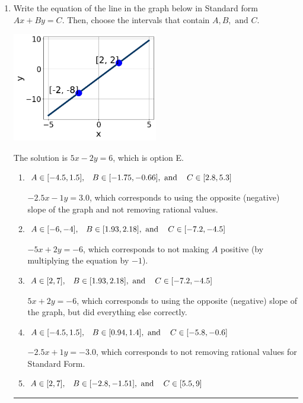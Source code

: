 \documentclass{extbook}[14pt]
\newcommand{\litem}[1]{\item #1

\rule{\textwidth}{0.4pt}}
\begin{document}
\begin{enumerate}\litem{
Write the equation of the line in the graph below in Standard form $Ax+By=C$. Then, choose the intervals that contain $A, B, \text{ and } C$.

\begin{center}
    \includegraphics[width=0.5\textwidth]{../Figures/linearGraphToStandardC.png}
\end{center}


The solution is \( 5x - 2y = 6 \), which is option E.\begin{enumerate}[label=\Alph*.]
\item \( A \in [-4.5, 1.5], \hspace{3mm} B \in [-1.75, -0.66], \text{ and } \hspace{3mm} C \in [2.8, 5.3] \)

 $-2.5x - 1y = 3.0$, which corresponds to using the opposite (negative) slope of the graph and not removing rational values.
\item \( A \in [-6, -4], \hspace{3mm} B \in [1.93, 2.18], \text{ and } \hspace{3mm} C \in [-7.2, -4.5] \)

 $-5x + 2y = -6$, which corresponds to not making $A$ positive (by multiplying the equation by $-1$).
\item \( A \in [2, 7], \hspace{3mm} B \in [1.93, 2.18], \text{ and } \hspace{3mm} C \in [-7.2, -4.5] \)

 $5x + 2y = -6$, which corresponds to using the opposite (negative) slope of the graph, but did everything else correctly.
\item \( A \in [-4.5, 1.5], \hspace{3mm} B \in [0.94, 1.4], \text{ and } \hspace{3mm} C \in [-5.8, -0.6] \)

 $-2.5x + 1y = -3.0$, which corresponds to not removing rational values for Standard Form.
\item \( A \in [2, 7], \hspace{3mm} B \in [-2.8, -1.51], \text{ and } \hspace{3mm} C \in [5.5, 9] \)


\end{enumerate}}
\end{enumerate}
\end{document}
